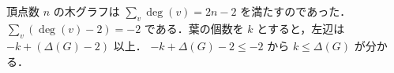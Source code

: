 \subsection{}
頂点数 $n$ の木グラフは $\sum_v \deg(v) = 2n-2$ を満たすのであった．
$\sum_v (\deg(v) - 2) = - 2$ である．葉の個数を $k$ とすると，左辺は $-k + (\Delta(G) - 2)$ 以上．
$-k + \Delta(G) - 2\leq -2$ から $k\leq \Delta(G)$ が分かる．